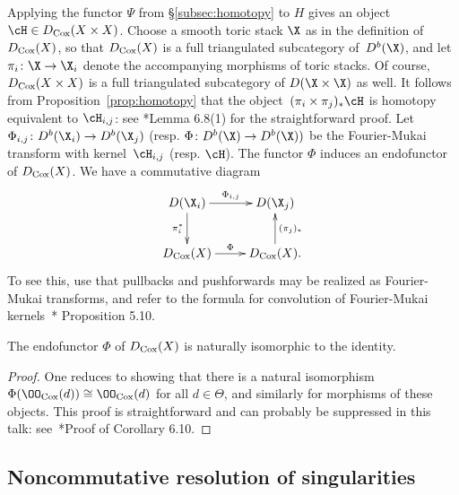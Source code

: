 \documentclass{amsart}
\begin{document}
Applying the functor $\Psi$ from \S \ref{subsec:homotopy} to $H$ gives an object $\cH\in D_{\Cox}(X \times X)$. Choose a smooth toric stack $\X$ as in the definition of $D_{\operatorname{Cox}}(X)$, so that $D_{\operatorname{Cox}}(X)$ is a full triangulated subcategory of~$D^b(\X)$, and let $\pi_i \co \X \to \X_i$ denote the accompanying morphisms of toric stacks. Of course,~$D_{\operatorname{Cox}}(X \times X)$ is a full triangulated subcategory of $D(\X \times \X)$ as well. It follows from Proposition~\ref{prop:homotopy} that the object~$(\pi_i \times \pi_j)_*\cH$ is homotopy equivalent to $\cH_{i, j}$: see \cite{BBB+24}*{Lemma 6.8(1)} for the straightforward proof. Let~$\Phi_{i, j} \co D^b(\X_i) \to D^b(\X_j)$ (resp. $\Phi \co D^b(\X) \to D^b(\X))$ be the Fourier-Mukai transform with kernel~$\cH_{i, j}$ (resp. $\cH$). The functor $\Phi$ induces an endofunctor of $D_{\operatorname{Cox}}(X)$. We have a commutative diagram
\begin{equation}
\label{eqn:phidiagram}
\xymatrix{
D(\X_i) \ar[r]^-{\Phi_{i, j}} \ar[d]_-{\pi_i^*} & D(\X_j) \\
D_{\Cox}(X) \ar[r]^-{\Phi} & D_{\Cox}(X).\ar[u]_-{(\pi_j)_*}
}
\end{equation}
To see this, use that pullbacks and pushforwards may be realized as Fourier-Mukai transforms, and refer to the formula for convolution of Fourier-Mukai kernels~\cite{Huybrechts2006}*{ Proposition 5.10}.



\begin{thm}\label{thm:resDiagCoxVague}
 The endofunctor $\Phi$ of $D_{\operatorname{Cox}}(X)$ is naturally isomorphic to the identity.
\end{thm}

\begin{proof}
One reduces to showing that there is a natural isomorphism $\Phi(\OO_{\Cox}(d)) \cong \OO_{\Cox}(d)$ for all $d \in \Theta$, and similarly for morphisms of these objects. This proof is straightforward and can probably be suppressed in this talk: see~\cite{BBB+24}*{Proof of Corollary 6.10}.
\end{proof}

\subsection{Noncommutative resolution of singularities}
\end{document}

